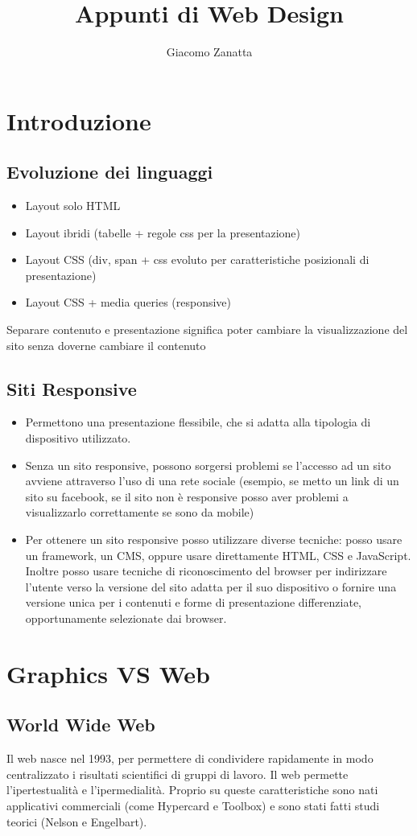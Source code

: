 \documentclass{article}
\title{Appunti di Web Design}
\author{Giacomo Zanatta}
\begin{document}
\maketitle
\tableofcontents
\section{Introduzione}
\subsection{Evoluzione dei linguaggi}
\begin{itemize}
\item Layout solo HTML
\item Layout ibridi (tabelle + regole css per la presentazione)
\item Layout CSS (div, span + css evoluto per caratteristiche posizionali di presentazione)
\item Layout CSS + media queries (responsive)
\end{itemize}
Separare contenuto e presentazione significa poter cambiare la visualizzazione del sito senza doverne cambiare il contenuto
\subsection{Siti Responsive}
\begin{itemize}
\item Permettono una presentazione flessibile, che si adatta alla tipologia di dispositivo utilizzato.
\item Senza un sito responsive, possono sorgersi problemi se l'accesso ad un sito avviene attraverso l'uso di una rete sociale (esempio, se metto un link di un sito su facebook, se il sito non è responsive posso aver problemi a visualizzarlo correttamente se sono da mobile)
\item Per ottenere un sito responsive posso utilizzare diverse tecniche: posso usare un framework, un CMS, oppure usare direttamente HTML, CSS e JavaScript. Inoltre posso usare tecniche di riconoscimento del browser per indirizzare l'utente verso la versione del sito adatta per il suo dispositivo o fornire una versione unica per i contenuti e forme di presentazione differenziate, opportunamente selezionate dai browser.
\end{itemize}
\section{Graphics VS Web}
\subsection{World Wide Web}
Il web nasce nel 1993, per permettere di condividere rapidamente in modo centralizzato i risultati scientifici di gruppi di lavoro.
Il web permette l'ipertestualità  e l'ipermedialità. Proprio su queste caratteristiche sono nati applicativi commerciali (come Hypercard e Toolbox) e sono stati fatti studi teorici (Nelson e Engelbart).
\end{document}
